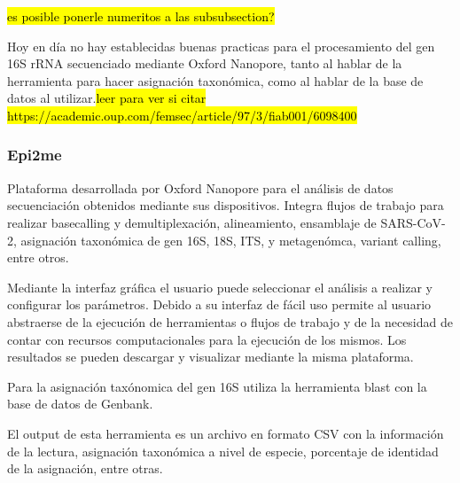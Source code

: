 \hl{es posible ponerle numeritos a las subsubsection?}

Hoy en día no hay establecidas buenas practicas para el procesamiento del gen 16S rRNA secuenciado mediante Oxford Nanopore, tanto al hablar de la herramienta para hacer asignación taxonómica, como al hablar de la base de datos al utilizar.\hl{leer para ver si citar https://academic.oup.com/femsec/article/97/3/fiab001/6098400}
\subsubsection{Epi2me}
Plataforma desarrollada por Oxford Nanopore para el análisis de datos secuenciación obtenidos mediante sus dispositivos. 
Integra flujos de trabajo para realizar basecalling y demultiplexación, alineamiento, ensamblaje de SARS-CoV-2, asignación taxonómica de gen 16S, 18S, ITS, y metagenómca, variant calling, entre otros.

Mediante la interfaz gráfica el usuario puede seleccionar el análisis a realizar y configurar los parámetros. Debido a su interfaz de fácil uso permite al usuario abstraerse de la ejecución de herramientas o flujos de trabajo y de la necesidad de contar con recursos computacionales para la ejecución de los mismos.
Los resultados se pueden descargar y visualizar mediante la misma plataforma.


Para la asignación taxónomica del gen 16S utiliza la herramienta blast con la base de datos de Genbank.

El output de esta herramienta es un archivo en formato CSV con la información de la lectura, asignación taxonómica a nivel de especie, porcentaje de identidad de la asignación, entre otras.
